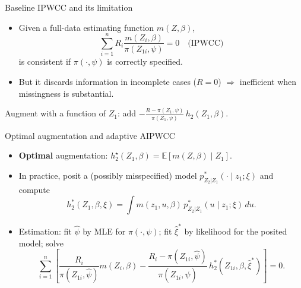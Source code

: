 \documentclass[xcolor=dvipsnames,aspectratio=169]{beamer}
\newcommand{\E}{\mathbb{E}}
\newcommand{\1}{\mathbbm{1}}
\begin{document}
\begin{frame}{Baseline IPWCC and its limitation}
  \begin{itemize}
    \item Given a full-data estimating function $m(Z,\beta)$,
    \[
      \sum_{i=1}^n R_i\frac{m(Z_i,\beta)}{\pi(Z_{1i},\psi)}=0 \quad\text{(IPWCC)}
    \]
    is consistent if $\pi(\cdot,\psi)$ is correctly specified.
    \item But it discards information in incomplete cases ($R=0$) $\Rightarrow$ inefficient when missingness is substantial.
  \end{itemize}
  \begin{tcolorbox}[title=Fix]
    Augment with a function of $Z_1$: add $\displaystyle -\frac{R-\pi(Z_1,\psi)}{\pi(Z_1,\psi)}\,h_2(Z_1,\beta)$.
  \end{tcolorbox}
\end{frame}

\begin{frame}{Optimal augmentation and adaptive AIPWCC}
  \begin{itemize}
    \item \textbf{Optimal} augmentation: $h_2^\star(Z_1,\beta)=\E\!\left[m(Z,\beta)\mid Z_1\right]$.
    \item In practice, posit a (possibly misspecified) model $p^\ast_{Z_2|Z_1}(\cdot\mid z_1;\xi)$ and compute
    \[
      h_2^\ast(Z_1,\beta,\xi)=\int m(z_1,u,\beta)\,p^\ast_{Z_2|Z_1}(u\mid z_1;\xi)\,du.
    \]
    \item Estimation: fit $\hat\psi$ by MLE for $\pi(\cdot,\psi)$; fit $\hat\xi^\ast$ by likelihood for the posited model; solve
    \[
      \sum_{i=1}^n\left[\frac{R_i}{\pi(Z_{1i},\hat\psi)}m(Z_i,\beta)
      -\frac{R_i-\pi(Z_{1i},\hat\psi)}{\pi(Z_{1i},\hat\psi)}\,h_2^\ast(Z_{1i},\beta,\hat\xi^\ast)\right]=0.
    \]
  \end{itemize}
\end{frame}
\end{document}
